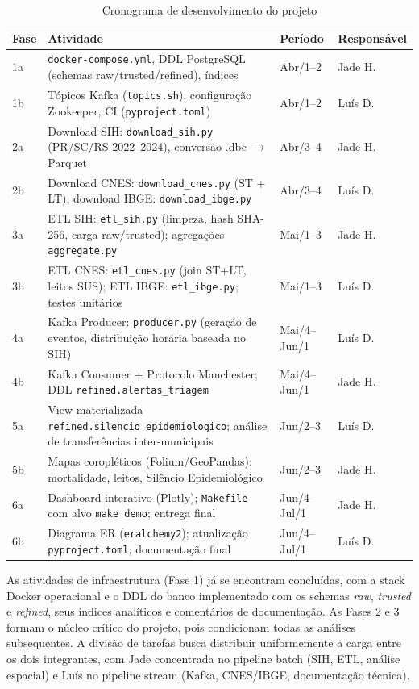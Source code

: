 \documentclass[12pt]{article}
\begin{document}
\begin{table}[ht]
\centering
\caption{Cronograma de desenvolvimento do projeto}
\label{tab:crono}
\begin{tabularx}{\textwidth}{lXll}
\toprule
\textbf{Fase} & \textbf{Atividade} & \textbf{Período} & \textbf{Responsável} \\
\midrule
1a & \texttt{docker-compose.yml}, DDL PostgreSQL (schemas raw/trusted/refined), índices & Abr/1--2 & Jade H. \\
1b & Tópicos Kafka (\texttt{topics.sh}), configuração Zookeeper, CI (\texttt{pyproject.toml}) & Abr/1--2 & Luís D. \\
\midrule
2a & Download SIH: \texttt{download\_sih.py} (PR/SC/RS 2022--2024), conversão .dbc $\to$ Parquet & Abr/3--4 & Jade H. \\
2b & Download CNES: \texttt{download\_cnes.py} (ST + LT), download IBGE: \texttt{download\_ibge.py} & Abr/3--4 & Luís D. \\
\midrule
3a & ETL SIH: \texttt{etl\_sih.py} (limpeza, hash SHA-256, carga raw/trusted); agregações \texttt{aggregate.py} & Mai/1--3 & Jade H. \\
3b & ETL CNES: \texttt{etl\_cnes.py} (join ST+LT, leitos SUS); ETL IBGE: \texttt{etl\_ibge.py}; testes unitários & Mai/1--3 & Luís D. \\
\midrule
4a & Kafka Producer: \texttt{producer.py} (geração de eventos, distribuição horária baseada no SIH) & Mai/4--Jun/1 & Luís D. \\
4b & Kafka Consumer + Protocolo Manchester; DDL \texttt{refined.alertas\_triagem} & Mai/4--Jun/1 & Jade H. \\
\midrule
5a & View materializada \texttt{refined.silencio\_epidemiologico}; análise de transferências inter-municipais & Jun/2--3 & Luís D. \\
5b & Mapas coropléticos (Folium/GeoPandas): mortalidade, leitos, Silêncio Epidemiológico & Jun/2--3 & Jade H. \\
\midrule
6a & Dashboard interativo (Plotly); \texttt{Makefile} com alvo \texttt{make demo}; entrega final & Jun/4--Jul/1 & Jade H. \\
6b & Diagrama ER (\texttt{eralchemy2}); atualização \texttt{pyproject.toml}; documentação final & Jun/4--Jul/1 & Luís D. \\
\bottomrule
\end{tabularx}
\end{table}

As atividades de infraestrutura (Fase 1) já se encontram concluídas, com a
stack Docker operacional e o DDL do banco implementado com os schemas
\textit{raw}, \textit{trusted} e \textit{refined}, seus índices analíticos e
comentários de documentação. As Fases 2 e 3 formam o núcleo crítico do
projeto, pois condicionam todas as análises subsequentes. A divisão de tarefas
busca distribuir uniformemente a carga entre os dois integrantes, com Jade
concentrada no pipeline batch (SIH, ETL, análise espacial) e Luís no pipeline
stream (Kafka, CNES/IBGE, documentação técnica).
\end{document}
